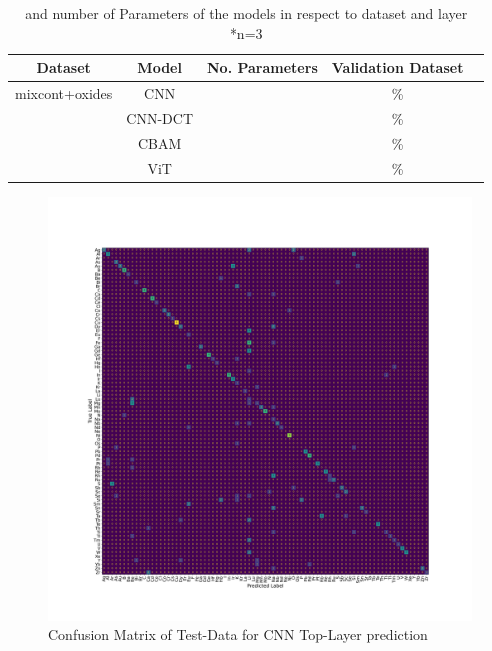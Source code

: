 \begin{table}[H]
    \centering
    \begin{tabular}{c|c|c|c|c}
        Dataset & Model   & No. Parameters & Validation Dataset      \\
        \hline
 mixcont+oxides& CNN     &                &        \%              \\
               & CNN-DCT &                &       \%               \\
               & CBAM    &                &       \%               \\
               & ViT     &                &       \%               \\

    \end{tabular}
    \caption{ and number of Parameters of the models in respect to dataset and layer
    *n=3}
    \label{tab:acc_depth}
\end{table}




\begin{center}
\begin{figure}
        \includegraphics[width=\textwidth]{Figures/best_task_1_model_CM.png}
    \centering
    \caption{Confusion Matrix of Test-Data for CNN Top-Layer prediction}
    \label{cm_cnn_1l}
\end{figure}
\end{center}